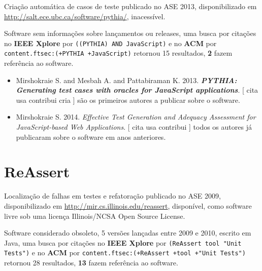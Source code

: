 Criação automática de casos de teste
publicado no ASE 2013,
disponibilizado em \url{http://salt.ece.ubc.ca/software/pythia/},
inacessível.

Software sem informações sobre lançamentos ou releases,
uma busca por citações no {\bf IEEE Xplore} por
\texttt{((PYTHIA) AND JavaScript)}
e no {\bf ACM} por
\texttt{content.ftsec:(+PYTHIA +JavaScript)}
retornou
15 resultados,
{\bf 2} fazem referência ao software.

\begin{itemize}
\item Mirshokraie S. and Mesbah A. and Pattabiraman K.
      2013.
        \textbf{\textit{ PYTHIA: Generating test cases with oracles for JavaScript applications}}.
      [
          cita
          usa
          contribui
          cria
      ]
são os primeiros autores a publicar sobre o software.
\item Mirshokraie S.
      2014.
        \textit{ Effective Test Generation and Adequacy Assessment for JavaScript-based Web Applications}.
      [
          cita
          usa
          contribui
      ]
todos os autores já publicaram sobre o software em anos anteriores.
\end{itemize}
\section{ReAssert}

Localização de falhas em testes e refatoração
publicado no ASE 2009,
disponibilizado em \url{http://mir.cs.illinois.edu/reassert},
disponível,
como software livre
sob uma licença Illinois/NCSA Open Source License.

Software considerado obsoleto,
5 versões lançadas
entre 2009 e 2010,
escrito em Java,
uma busca por citações no {\bf IEEE Xplore} por
\texttt{(ReAssert tool "Unit Tests")}
e no {\bf ACM} por
\texttt{content.ftsec:(+ReAssert +tool +"Unit Tests")}
retornou
28 resultados,
{\bf 13} fazem referência ao software.

